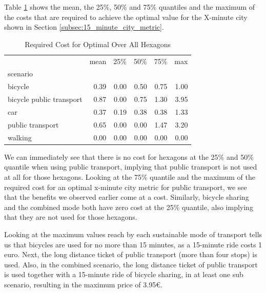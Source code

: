 Table \ref{tab:required_cost} shows the mean, the 25\%, 50\% and 75\% quantiles and the maximum of the costs that are required to achieve the optimal value for the X-minute city shown in Section \ref{subsec:15_minute_city_metric}.
\begin{table}
  \caption{Required Cost for Optimal Over All Hexagons}
  \label{tab:required_cost}
  \begin{center}
    \begin{tabular}{lrrrrr}
     & mean & 25\% & 50\% & 75\% & max \\
    scenario &  &  &  &  &  \\
    bicycle & 0.39 & 0.00 & 0.50 & 0.75 & 1.00 \\
    bicycle public transport & 0.87 & 0.00 & 0.75 & 1.30 & 3.95 \\
    car & 0.37 & 0.19 & 0.38 & 0.38 & 1.33 \\
    public transport & 0.65 & 0.00 & 0.00 & 1.47 & 3.20 \\
    walking & 0.00 & 0.00 & 0.00 & 0.00 & 0.00 \\
    \end{tabular}
  \end{center}
\end{table}
We can immediately see that there is no cost for hexagons at the 25\% and 50\% quantile when using public transport, implying that public transport is not used at all for those hexagons.
Looking at the 75\% quantile and the maximum of the required cost for an optimal x-minute city metric for public transport, we see that the benefits we observed earlier come at a cost.
Similarly, bicycle sharing and the combined mode both have zero cost at the 25\% quantile, also implying that they are not used for those hexagons.

Looking at the maximum values reach by each sustainable mode of transport tells us that bicycles are used for no more than 15 minutes, as a 15-minute ride costs 1 euro.
Next, the long distance ticket of public transport (more than four stops) is used.
Also, in the combined scenario, the long distance ticket of public transport is used together with a 15-minute ride of bicycle sharing, in at least one sub scenario, resulting in the maximum price of 3.95€.

